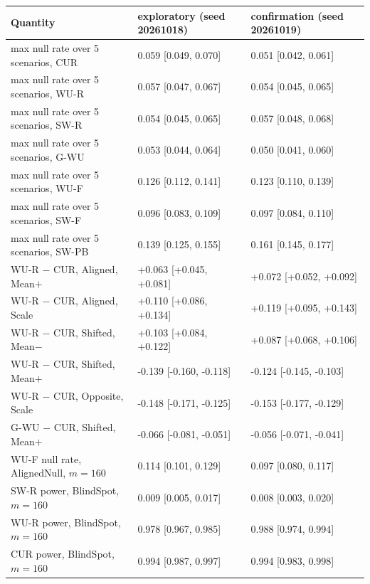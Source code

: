 \begin{tabular}{@{}lll@{}}
\toprule
Quantity & exploratory (seed 20261018) & confirmation (seed 20261019)\\
\midrule
max null rate over 5 scenarios, CUR & 0.059 [0.049, 0.070] & 0.051 [0.042, 0.061]\\
max null rate over 5 scenarios, WU-R & 0.057 [0.047, 0.067] & 0.054 [0.045, 0.065]\\
max null rate over 5 scenarios, SW-R & 0.054 [0.045, 0.065] & 0.057 [0.048, 0.068]\\
max null rate over 5 scenarios, G-WU & 0.053 [0.044, 0.064] & 0.050 [0.041, 0.060]\\
max null rate over 5 scenarios, WU-F & 0.126 [0.112, 0.141] & 0.123 [0.110, 0.139]\\
max null rate over 5 scenarios, SW-F & 0.096 [0.083, 0.109] & 0.097 [0.084, 0.110]\\
max null rate over 5 scenarios, SW-PB & 0.139 [0.125, 0.155] & 0.161 [0.145, 0.177]\\
WU-R $-$ CUR, Aligned, Mean$+$ & +0.063 [+0.045, +0.081] & +0.072 [+0.052, +0.092]\\
WU-R $-$ CUR, Aligned, Scale & +0.110 [+0.086, +0.134] & +0.119 [+0.095, +0.143]\\
WU-R $-$ CUR, Shifted, Mean$-$ & +0.103 [+0.084, +0.122] & +0.087 [+0.068, +0.106]\\
WU-R $-$ CUR, Shifted, Mean$+$ & -0.139 [-0.160, -0.118] & -0.124 [-0.145, -0.103]\\
WU-R $-$ CUR, Opposite, Scale & -0.148 [-0.171, -0.125] & -0.153 [-0.177, -0.129]\\
G-WU $-$ CUR, Shifted, Mean$+$ & -0.066 [-0.081, -0.051] & -0.056 [-0.071, -0.041]\\
WU-F null rate, AlignedNull, $m=160$ & 0.114 [0.101, 0.129] & 0.097 [0.080, 0.117]\\
SW-R power, BlindSpot, $m=160$ & 0.009 [0.005, 0.017] & 0.008 [0.003, 0.020]\\
WU-R power, BlindSpot, $m=160$ & 0.978 [0.967, 0.985] & 0.988 [0.974, 0.994]\\
CUR power, BlindSpot, $m=160$ & 0.994 [0.987, 0.997] & 0.994 [0.983, 0.998]\\
\bottomrule
\end{tabular}